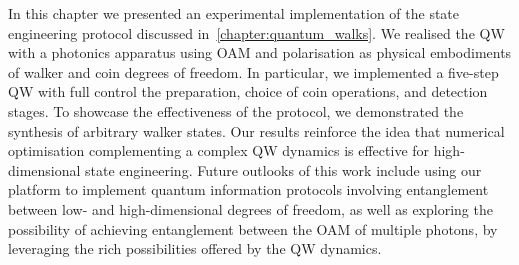 In this chapter we presented an experimental implementation of the state engineering protocol discussed in~\cref{chapter:quantum_walks}. We realised the QW with a photonics apparatus using \ac{OAM} and polarisation as physical embodiments of walker and coin degrees of freedom.
In particular, we implemented a five-step \ac{QW} with full control the preparation, choice of coin operations, and detection stages. To showcase the effectiveness of the protocol, we demonstrated the synthesis of arbitrary walker states.
Our results reinforce the idea that numerical optimisation complementing a complex \ac{QW} dynamics is effective for high-dimensional state engineering.
Future outlooks of this work include using our platform to implement quantum information protocols involving entanglement between low- and high-dimensional degrees of freedom, as well as exploring the possibility of achieving entanglement between the OAM of multiple photons, by leveraging the rich possibilities offered by the QW dynamics.
